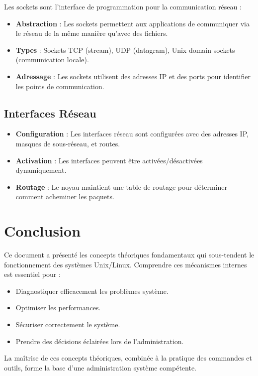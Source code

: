 \documentclass[12pt,a4paper]{article}
\begin{document}
Les sockets sont l'interface de programmation pour la communication réseau :

\begin{itemize}
    \item \textbf{Abstraction} : Les sockets permettent aux applications de communiquer via le réseau de la même manière qu'avec des fichiers.
    
    \item \textbf{Types} : Sockets TCP (stream), UDP (datagram), Unix domain sockets (communication locale).
    
    \item \textbf{Adressage} : Les sockets utilisent des adresses IP et des ports pour identifier les points de communication.
\end{itemize}

\subsection{Interfaces Réseau}

\begin{itemize}
    \item \textbf{Configuration} : Les interfaces réseau sont configurées avec des adresses IP, masques de sous-réseau, et routes.
    
    \item \textbf{Activation} : Les interfaces peuvent être activées/désactivées dynamiquement.
    
    \item \textbf{Routage} : Le noyau maintient une table de routage pour déterminer comment acheminer les paquets.
\end{itemize}


\section*{Conclusion}

Ce document a présenté les concepts théoriques fondamentaux qui sous-tendent le fonctionnement des systèmes Unix/Linux. Comprendre ces mécanismes internes est essentiel pour :

\begin{itemize}
    \item Diagnostiquer efficacement les problèmes système.
    \item Optimiser les performances.
    \item Sécuriser correctement le système.
    \item Prendre des décisions éclairées lors de l'administration.
\end{itemize}

La maîtrise de ces concepts théoriques, combinée à la pratique des commandes et outils, forme la base d'une administration système compétente.
\end{document}
